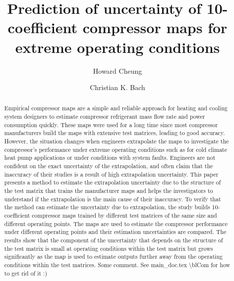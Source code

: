 \documentclass[a4paper]{jpconf}
\newcommand{\blCom}[1]{\begingroup\sffamily\color{blue} #1 \endgroup}  %
\begin{document}
\title{Prediction of uncertainty of 10-coefficient compressor maps for extreme operating conditions}

\author{Howard Cheung}

\address{Postdoctoral Research Fellow, Ray W. Herrick Laboratories, School of Mechanical Engineering, Purdue University, 177 S. Russell St., West Lafayette, IN 47907-2031, US}


\author{Christian K. Bach}

\address{Assistant Professor, Mechanical and Aerospace Engineering, Oklahoma State University, 218 Engineering North, Stillwater, OK 74078-5016}


\begin{abstract}
Empirical compressor maps are a simple and reliable approach for heating and cooling system designers to estimate compressor refrigerant mass flow rate and power consumption quickly. These maps were used for a long time since most compressor manufacturers build the maps with extensive test matrices, leading to good accuracy. However, the situation changes when engineers extrapolate the maps to investigate the compressor's performance under extreme operating conditions such as for cold climate heat pump applications or under conditions with system faults.  Engineers are not confident on the exact uncertainty of the extrapolation, and often claim that the inaccuracy of their studies is a result of high extrapolation uncertainty. This paper presents a method to estimate the extrapolation uncertainty due to the structure of the test matrix that trains the manufacturer maps and helps the investigators to understand if the extrapolation is the main cause of their inaccuracy. To verify that the method can estimate the uncertainty due to extrapolation, the study builds 10-coefficient compressor maps trained by different test matrices of the same size and different operating points. The maps are used to estimate the compressor performance under different operating points and their estimation uncertainties are compared. The results show that the component of the uncertainty that depends on the structure of the test matrix is small at operating conditions within the test matrix but grows significantly as the map is used to estimate outputs further away from the operating conditions within the test matrices.\blCom{Some comment.  See main\_doc.tex \textbackslash blCom for how to get rid of it :)}
\end{abstract}
\end{document}
